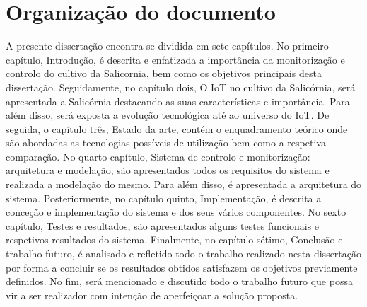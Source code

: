 \section{Organização do documento}


A presente dissertação encontra-se dividida em sete capítulos. No primeiro capítulo, Introdução, é descrita e enfatizada a importância da monitorização e controlo do cultivo da Salicornia, bem como os objetivos principais desta dissertação. Seguidamente, no capítulo dois, O \ac{IoT} no cultivo da Salicórnia, será apresentada a Salicórnia destacando as suas características e importância. Para além disso, será  
exposta a evolução tecnológica até ao universo do \ac{IoT}. De seguida, o capítulo três, Estado da arte, contém o enquadramento teórico onde são abordadas as tecnologias possíveis de utilização bem como a respetiva comparação. No quarto capítulo, Sistema de controlo e monitorização: arquitetura e modelação, são apresentados todos os requisitos do sistema e realizada a modelação do mesmo. Para além disso, é apresentada a arquitetura do sistema. Posteriormente, no capítulo quinto, Implementação, é descrita a conceção e implementação do sistema e dos seus vários componentes. No sexto capítulo, Testes e resultados, são apresentados alguns testes funcionais e respetivos resultados do sistema. Finalmente, no capítulo sétimo, Conclusão e trabalho futuro, é analisado e refletido todo o trabalho realizado nesta dissertação por forma a concluir se os resultados obtidos satisfazem os objetivos previamente definidos. No fim, será mencionado e discutido todo o trabalho futuro que possa vir a ser realizador com intenção de aperfeiçoar a solução proposta. 



























